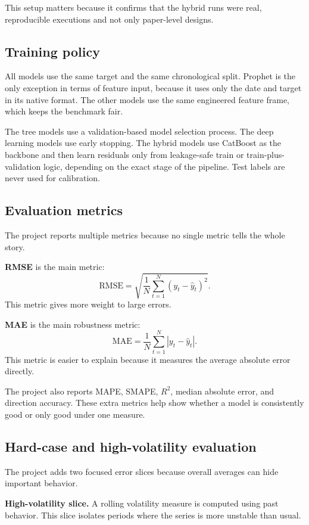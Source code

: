 \documentclass[conference]{IEEEtran}
\begin{document}
This setup matters because it confirms that the hybrid runs were real, reproducible executions and not only paper-level designs.

\subsection{Training policy}
All models use the same target and the same chronological split. Prophet is the only exception in terms of feature input, because it uses only the date and target in its native format. The other models use the same engineered feature frame, which keeps the benchmark fair.

The tree models use a validation-based model selection process. The deep learning models use early stopping. The hybrid models use CatBoost as the backbone and then learn residuals only from leakage-safe train or train-plus-validation logic, depending on the exact stage of the pipeline. Test labels are never used for calibration.

\subsection{Evaluation metrics}
The project reports multiple metrics because no single metric tells the whole story.

\textbf{RMSE} is the main metric:
\begin{equation}
\mathrm{RMSE}=\sqrt{\frac{1}{N}\sum_{t=1}^{N}(y_t-\hat{y}_t)^2}.
\end{equation}
This metric gives more weight to large errors.

\textbf{MAE} is the main robustness metric:
\begin{equation}
\mathrm{MAE}=\frac{1}{N}\sum_{t=1}^{N}|y_t-\hat{y}_t|.
\end{equation}
This metric is easier to explain because it measures the average absolute error directly.

The project also reports MAPE, SMAPE, $R^2$, median absolute error, and direction accuracy. These extra metrics help show whether a model is consistently good or only good under one measure.

\subsection{Hard-case and high-volatility evaluation}
The project adds two focused error slices because overall averages can hide important behavior.

\textbf{High-volatility slice.} A rolling volatility measure is computed using past behavior. This slice isolates periods where the series is more unstable than usual.
\end{document}
